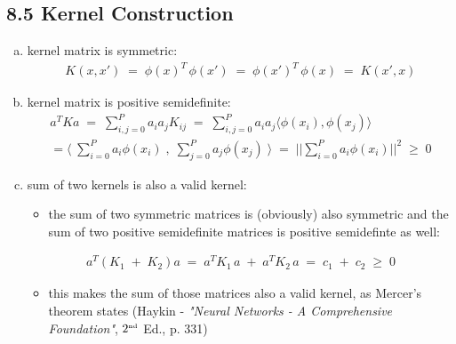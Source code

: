 \documentclass[10pt,a4paper]{article}
\begin{document}
\subsection*{8.5 Kernel Construction}
\begin{enumerate}[a)]
\item kernel matrix is symmetric:
\begin{eqnarray}
K(x,x')\;=\;\phi(x)^T\,\phi(x')\;=\;\phi(x')^T\,\phi(x)\;=\;K(x',x)
\end{eqnarray}
\item kernel matrix is positive semidefinite:
\begin{eqnarray}
a^T K a\;=\;\sum^P_{i,j=0} a_i a_j K_{ij}\;=\;\sum^P_{i,j=0}a_i a_j \langle \phi(x_i), \phi(x_j) \rangle \\
= \langle\; \sum^P_{i=0}a_i \phi(x_i) \;,\; \sum^P_{j=0} a_j \phi(x_j)\;\rangle \;=\; || \sum_{i=0}^P a_i \phi(x_i) ||^2 \;\geq\;0
\end{eqnarray}
\item sum of two kernels is also a valid kernel:
\begin{itemize}
\item the sum of two symmetric matrices is (obviously) also symmetric and the sum of two positive semidefinite matrices is positive semidefinte as well:
\end{itemize}
\begin{eqnarray}
a^T (K_1\;+\;K_2) a\;=\;a^T K_1 \,a\;+\;a^T K_2 \,a\;=\;c_1\;+\;c_2\;\geq\;0
\end{eqnarray}
\begin{itemize}
\item this makes the sum of those matrices also a valid kernel, as Mercer's theorem states (Haykin - \textit{"Neural Networks - A Comprehensive Foundation"},$\;2^{\mbox{\tiny{nd}}}$ Ed., p. 331)
\end{itemize}
\end{enumerate}
\end{document}
